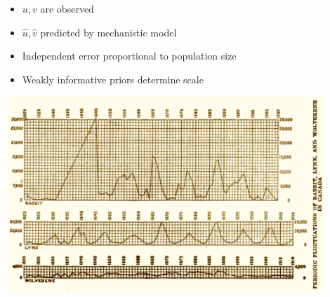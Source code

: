 \documentclass[9pt]{report}
\begin{document}
\begin{itemize}
\item $u, v$ are observed
\item $\hat{u}, \hat{v}$ predicted by mechanistic model
\item Independent error proportional to population size
\item Weakly informative priors determine scale
\end{itemize}

\begin{center}
\includegraphics[width=0.9\textwidth]{img/hudons-bay-data.png}
\end{center}
\end{document}
